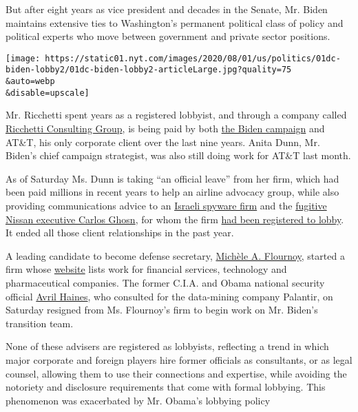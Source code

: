 But after eight years as vice president and decades in the Senate, Mr.
Biden maintains extensive ties to Washington's permanent political class
of policy and political experts who move between government and private
sector positions.

\texttt{[image: https://static01.nyt.com/images/2020/08/01/us/politics/01dc-biden-lobby2/01dc-biden-lobby2-articleLarge.jpg?quality=75\\\&auto=webp\\\&disable=upscale]}

Mr. Ricchetti spent years as a registered lobbyist, and through a
company called
\href{https://www.documentcloud.org/documents/7010940-Biden-s-Campaign-Chairman-Formed-a-Consulting.html}{Ricchetti
Consulting Group}, is being paid by both
\href{https://docquery.fec.gov/cgi-bin/fecimg/?202007209260662530}{the
Biden campaign} and AT\&T, his only corporate client over the last nine
years. Anita Dunn, Mr. Biden's chief campaign strategist, was also still
doing work for AT\&T last month.

As of Saturday Ms. Dunn is taking ``an official leave'' from her firm,
which had been paid millions in recent years to help an airline advocacy
group, while also providing communications advice to an
\href{https://www.fastcompany.com/90326297/despite-ban-on-spyware-ads-google-allows-ad-blitz-by-hacking-firm-nso-group}{Israeli
spyware firm} and the
\href{https://www.nytimes.com/2018/12/30/business/carlos-ghosn-nissan.html}{fugitive
Nissan executive Carlos Ghosn}, for whom the firm
\href{https://soprweb.senate.gov/index.cfm?event=getFilingDetails\&filingID=55E9C7ED-A93B-4EAE-89BD-EEDE67B2C6DC\&filingTypeID=71}{had
been registered to lobby}. It ended all those client relationships in
the past year.

A leading candidate to become defense secretary,
\href{https://secure.joebiden.com/onlineactions/D4_IIHrm0UuSIFTqaXIRbg2?attr=100631128\&fbclid=IwAR28X8O4TQiVQ3h8k8NW6tTZP4JhoiaR0mVS8N0w3N0tzyKalfFUw4sraaQ}{Michèle
A. Flournoy}, started a firm whose
\href{http://westexec.com/\#about}{website} lists work for financial
services, technology and pharmaceutical companies. The former C.I.A. and
Obama national security official
\href{https://secure.joebiden.com/onlineactions/-SChB7ieakavs37tU3NAZA2?attr=100631128\&fbclid=IwAR2_qh2WkEzd-Oj-GXwD-kFly0zIfeQe1wgZdkBrOWexdi06sy11yqQiNqs}{Avril
Haines}, who consulted for the data-mining company Palantir, on Saturday
resigned from Ms. Flournoy's firm to begin work on Mr. Biden's
transition team.

None of these advisers are registered as lobbyists, reflecting a trend
in which major corporate and foreign players hire former officials as
consultants, or as legal counsel, allowing them to use their connections
and expertise, while avoiding the notoriety and disclosure requirements
that come with formal lobbying. This phenomenon was exacerbated by Mr.
Obama's lobbying policy

